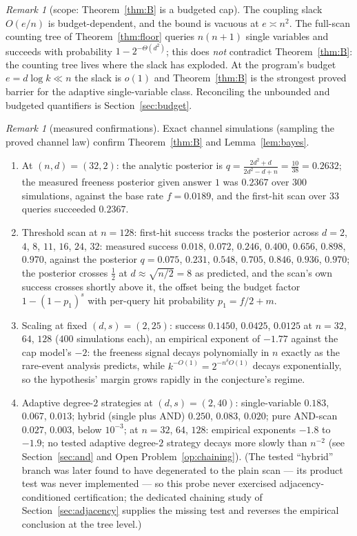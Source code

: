\documentclass[11pt]{article}
\theoremstyle{definition}
\theoremstyle{remark}
\newtheorem{remark}[theorem]{Remark}
\begin{document}
\begin{remark}[scope: Theorem~\ref{thm:B} is a budgeted cap]
\label{rem:Bscope}
The coupling slack $O(e/n)$ is budget-dependent, and the bound is
vacuous at $e\asymp n^2$.  The full-scan counting tree of
Theorem~\ref{thm:floor} queries $n(n+1)$ single variables and succeeds
with probability $1-2^{-\Theta(d^2)}$; this does \emph{not} contradict
Theorem~\ref{thm:B}: the counting tree lives where the slack has
exploded.  At the program's budget $e=d\log k\ll n$ the slack is
$o(1)$ and Theorem~\ref{thm:B} is the strongest proved barrier for the
adaptive single-variable class.  Reconciling the unbounded and
budgeted quantifiers is Section~\ref{sec:budget}.
\end{remark}

\begin{remark}[measured confirmations]\label{rem:measured-adaptive}
Exact channel simulations (sampling the proved channel law) confirm
Theorem~\ref{thm:B} and Lemma~\ref{lem:bayes}.
\begin{enumerate}
\item At $(n,d)=(32,2)$: the analytic posterior is
$q=\frac{2d^2+d}{2d^2-d+n}=\frac{10}{38}=0.2632$; the measured freeness
posterior given answer $1$ was $0.2367$ over $300$ simulations, against
the base rate $f=0.0189$, and the first-hit scan over $33$ queries
succeeded $0.2367$.
\item Threshold scan at $n=128$: first-hit success tracks the posterior
across $d=2$, $4$, $8$, $11$, $16$, $24$, $32$: measured success
$0.018$, $0.072$, $0.246$, $0.400$, $0.656$, $0.898$, $0.970$, against
the posterior $q=0.075$, $0.231$, $0.548$, $0.705$, $0.846$, $0.936$,
$0.970$; the posterior crosses
$\frac12$ at $d\approx\sqrt{n/2}=8$ as predicted, and the scan's own
success crosses shortly above it, the offset being the budget factor
$1-(1-p_1)^{s}$ with per-query hit probability $p_1=f/2+m$.
\item Scaling at fixed $(d,s)=(2,25)$: success
$0.1450$, $0.0425$, $0.0125$ at $n=32$, $64$, $128$ ($400$ simulations
each), an
empirical exponent of $-1.77$ against the cap model's $-2$: the
freeness signal decays polynomially in $n$ exactly as the rare-event
analysis predicts, while $k^{-O(1)}=2^{-n^{\delta}O(1)}$ decays
exponentially, so the hypothesis' margin grows rapidly in the
conjecture's regime.
\item Adaptive degree-$2$ strategies at $(d,s)=(2,40)$: single-variable
$0.183$, $0.067$, $0.013$; hybrid (single plus AND) $0.250$, $0.083$,
$0.020$; pure AND-scan $0.027$, $0.003$, below $10^{-3}$; at $n=32$,
$64$, $128$: empirical exponents
$-1.8$ to $-1.9$; no tested adaptive degree-$2$ strategy decays more
slowly than $n^{-2}$ (see Section~\ref{sec:and} and Open
Problem~\ref{op:chaining}).  (The tested ``hybrid'' branch was later
found to have degenerated to the plain scan --- its product test was
never implemented --- so this probe never exercised
adjacency-conditioned certification; the dedicated chaining study of
Section~\ref{sec:adjacency} supplies the missing test and reverses the
empirical conclusion at the tree level.)
\end{enumerate}
\end{remark}
\end{document}
